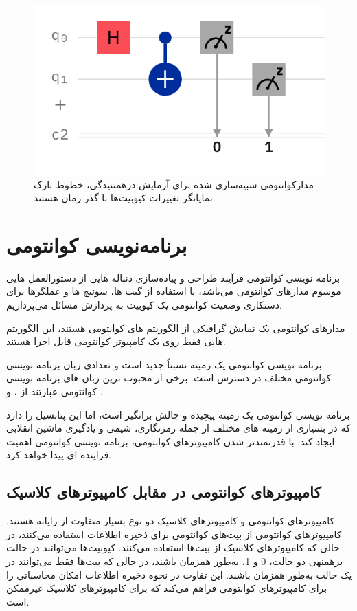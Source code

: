 \documentclass{book}
\begin{document}
\begin{figure}[ht]
	\centering
	\includegraphics[]{meas-firstcirc.png}
	\caption{مدارکوانتومی شبیه‌سازی شده برای آزمایش درهمتنیدگی، خطوط نازک نمایانگر تغییرات کیوبیت‌ها با گذر زمان هستند.}
\end{figure}

\chapter{برنامه‌نویسی کوانتومی}
برنامه نویسی کوانتومی فرآیند طراحی و پیاده‌سازی دنباله هایی از دستورالعمل هایی موسوم مدارهای کوانتومی می‌باشد، با استفاده از گیت ها، سوئیچ ها و عملگرها برای دستکاری وضعیت کوانتومی یک کیوبیت به پردازش مسائل می‌پردازیم.

مدارهای کوانتومی یک نمایش گرافیکی از الگوریتم های کوانتومی هستند، این الگوریتم هایی فقط روی یک کامپیوتر کوانتومی قابل اجرا هستند.

برنامه نویسی کوانتومی یک زمینه نسبتاً جدید است و تعدادی زبان برنامه نویسی کوانتومی مختلف در دسترس است. برخی از محبوب ترین زبان های برنامه نویسی کوانتومی عبارتند از ،  و .

برنامه نویسی کوانتومی یک زمینه پیچیده و چالش برانگیز است، اما این پتانسیل را دارد که در بسیاری از زمینه های مختلف از جمله رمزنگاری، شیمی و یادگیری ماشین انقلابی ایجاد کند. با قدرتمندتر شدن کامپیوترهای کوانتومی، برنامه نویسی کوانتومی اهمیت فزاینده ای پیدا خواهد کرد.
\section{کامپیوترهای کوانتومی در مقابل کامپیوترهای کلاسیک}



کامپیوترهای کوانتومی و کامپیوترهای کلاسیک دو نوع بسیار متفاوت از رایانه هستند. کامپیوترهای کوانتومی از بیت‌های کوانتومی برای ذخیره اطلاعات استفاده می‌کنند، در حالی که کامپیوترهای کلاسیک از بیت‌ها استفاده می‌کنند. کیوبیت‌ها می‌توانند در حالت برهمنهی دو حالت، 0 و 1، به‌طور همزمان باشند، در حالی که بیت‌ها فقط می‌توانند در یک حالت به‌طور همزمان باشند. این تفاوت در نحوه ذخیره اطلاعات امکان محاسباتی را برای کامپیوترهای کوانتومی فراهم می‌کند که برای کامپیوترهای کلاسیک غیرممکن است.
\end{document}
